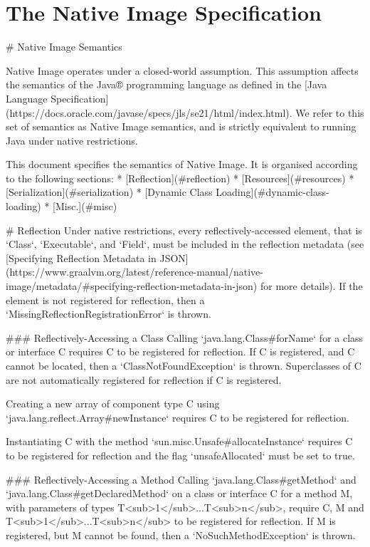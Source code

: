 \chapter{The Native Image Specification}\label{native_image_specs}
# Native Image Semantics

Native Image operates under a closed-world assumption. This assumption affects the semantics of the 
Java® programming language as defined in the 
[Java Language Specification](https://docs.oracle.com/javase/specs/jls/se21/html/index.html).
We refer to this set of semantics as Native Image semantics, and is strictly equivalent to running
Java under native restrictions.

This document specifies the semantics of Native Image.
It is organised according to the following sections:
* [Reflection](#reflection)
* [Resources](#resources)
* [Serialization](#serialization)
* [Dynamic Class Loading](#dynamic-class-loading)
* [Misc.](#misc)

# Reflection
Under native restrictions, every reflectively-accessed element, that is `Class`, `Executable`, and `Field`, must 
be included in the reflection metadata (see [Specifying Reflection Metadata in JSON](https://www.graalvm.org/latest/reference-manual/native-image/metadata/#specifying-reflection-metadata-in-json)
for more details). If the element is not registered for reflection, then a `MissingReflectionRegistrationError` is thrown.

### Reflectively-Accessing a Class
Calling `java.lang.Class#forName` for a class or interface C requires C to be registered for reflection.
If C is registered, and C cannot be located, then a `ClassNotFoundException` is thrown. 
Superclasses of C are not automatically registered for reflection if C is registered.

Creating a new array of component type C using `java.lang.reflect.Array#newInstance` requires C to be 
registered for reflection.

Instantiating C with the method `sun.misc.Unsafe#allocateInstance` requires C to be 
registered for reflection and the flag `unsafeAllocated` must be set to true.

### Reflectively-Accessing a Method
Calling `java.lang.Class#getMethod` and `java.lang.Class#getDeclaredMethod` on a class or interface C for a method M, 
with parameters of types T<sub>1</sub>...T<sub>n</sub>, require C, M and T<sub>1</sub>...T<sub>n</sub> to be registered 
for reflection.
If M is registered, but M cannot be found, then a `NoSuchMethodException` is thrown.

